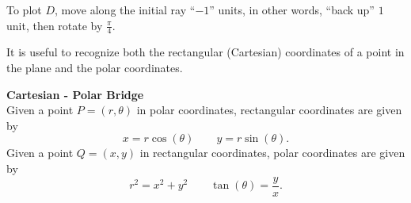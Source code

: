 \documentclass{ximera}
\begin{document}
\begin{example}
  To plot $D$, move along the initial ray ``$-1$'' units, in other
  words, ``back up'' $1$ unit, then rotate
   by
  $\frac{\pi}{4}$.
  \begin{hint}
    \begin{image}
    \end{image}
  \end{hint}



\end{example}


















It is useful to recognize both the rectangular (Cartesian)
coordinates of a point in the plane and the polar coordinates.

\begin{theorem}  \textbf{\textcolor{green!50!black}{Cartesian - Polar Bridge}} \\

Given a point $P=(r,\theta)$ in polar coordinates, rectangular
coordinates are given by
\[
x=r\cos(\theta)\qquad y=r\sin(\theta).
\]
Given a point $Q=(x,y)$ in rectangular coordinates, polar coordinates
are given by
\[
r^2=x^2+y^2\qquad \tan(\theta) = \frac{y}{x}.
\]
\end{theorem}
\end{document}
